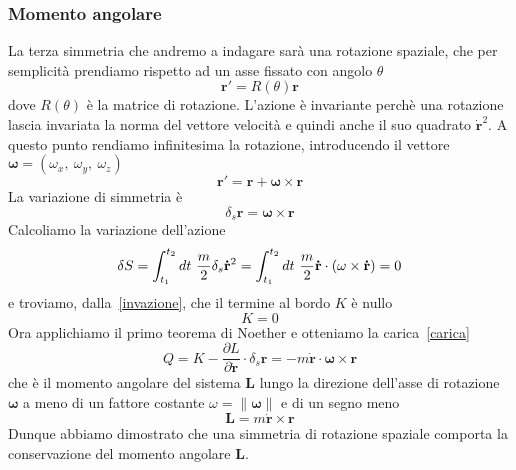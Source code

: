 \begin{example}
    \subsubsection{Momento angolare}
        La terza simmetria che andremo a indagare sarà una rotazione spaziale, che per semplicità prendiamo rispetto ad un asse fissato con angolo $\theta$
    \begin{equation}
        \mathbf r' = R(\theta) \mathbf r
    \end{equation}
        dove $R(\theta)$ è la matrice di rotazione. L'azione è invariante perchè una rotazione lascia invariata la norma del vettore velocità e quindi anche il suo quadrato $\mathbf{\dot r}^2$. A questo punto rendiamo infinitesima la rotazione, introducendo il vettore $\boldsymbol \omega = (\omega_x,~\omega_y,~\omega_z)$
    \begin{equation}
        \mathbf r' = \mathbf r + \boldsymbol \omega \times \mathbf r
    \end{equation}
        La variazione di simmetria è
    \begin{equation*}
        \delta_s \mathbf r = \boldsymbol \omega \times \mathbf r
    \end{equation*}
        Calcoliamo la variazione dell'azione
    \begin{equation}
        \delta S = \int_{t_1}^{t_2}dt~ \frac{m}{2} \delta_s \mathbf{\dot r}^2 = \int_{t_1}^{t_2}dt~ \frac{m}{2} \mathbf{\dot r} \cdot (\omega \times \mathbf{\dot r} ) = 0
    \end{equation}
        e troviamo, dalla~\eqref{invazione}, che il termine al bordo $K$ è nullo
    \begin{equation*}
        K = 0
    \end{equation*}
        Ora applichiamo il primo teorema di Noether e otteniamo la carica~\eqref{carica} 
    \begin{equation}
        Q = K - \frac{\partial L}{\partial \mathbf{\dot r}} \cdot \delta_s \mathbf r = - m \mathbf{\dot r} \cdot \boldsymbol\omega \times \mathbf r 
    \end{equation}
        che è il momento angolare del sistema $\mathbf L$ lungo la direzione dell'asse di rotazione $\boldsymbol \omega$ a meno di un fattore costante $\omega = \|\boldsymbol \omega\|$ e di un segno meno
    \begin{equation*}
        \mathbf L = m \mathbf{\dot r} \times \mathbf r
    \end{equation*}
        Dunque abbiamo dimostrato che una simmetria di rotazione spaziale comporta la conservazione del momento angolare $\mathbf L$.


\end{example}
